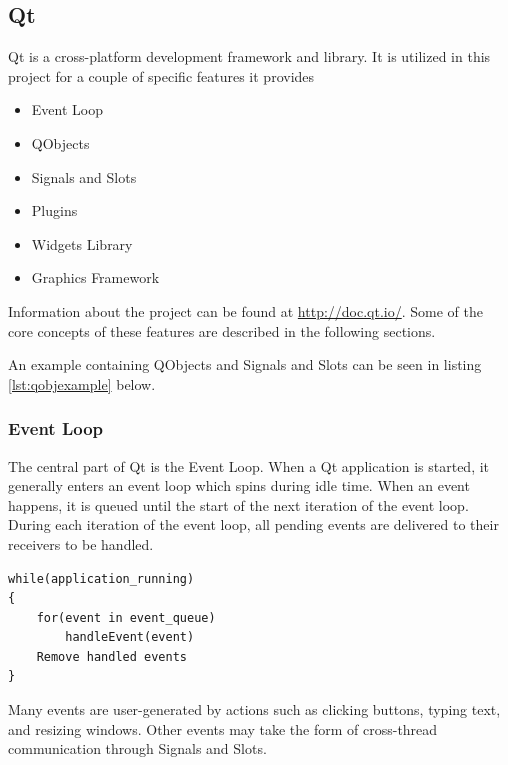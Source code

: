 \subsection{Qt}
	Qt is a cross-platform development framework and library. It is utilized in this project for a couple of specific features it provides
	\begin{itemize}
		\item Event Loop
		\item QObjects
		\item Signals and Slots
		\item Plugins
		\item Widgets Library
		\item Graphics Framework
	\end{itemize}
	Information about the project can be found at \url{http://doc.qt.io/}. Some of the core concepts of these features are described in the following sections.
	
	An example containing QObjects and Signals and Slots can be seen in listing \ref{lst:qobjexample} below.
	
\subsubsection*{Event Loop}
	The central part of Qt is the Event Loop. When a Qt application is started, it generally enters an event loop which spins during idle time. When an event happens, it is queued until the start of the next iteration of the event loop. During each iteration of the event loop, all pending events are delivered to their receivers to be handled.
	
	\begin{lstlisting}[caption={Pseudocode for the Qt Event Loop}]
while(application_running)
{
	for(event in event_queue)
		handleEvent(event)
	Remove handled events
}
	\end{lstlisting}
	
	Many events are user-generated by actions such as clicking buttons, typing text, and resizing windows. Other events may take the form of cross-thread communication through Signals and Slots.
	
